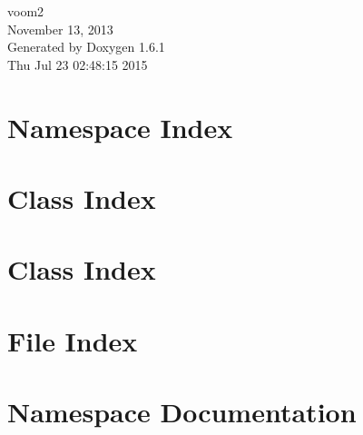 \documentclass[a4paper]{book}
\begin{document}
\hypersetup{pageanchor=false}
\begin{titlepage}
\vspace*{7cm}
\begin{center}
{\Large voom2 \\[1ex]\large November 13, 2013 }\\
\vspace*{1cm}
{\large Generated by Doxygen 1.6.1}\\
\vspace*{0.5cm}
{\small Thu Jul 23 02:48:15 2015}\\
\end{center}
\end{titlepage}
\clearemptydoublepage
{}
\tableofcontents
\clearemptydoublepage
{}
\hypersetup{pageanchor=true}
\chapter{Namespace Index}

\chapter{Class Index}

\chapter{Class Index}

\chapter{File Index}

\chapter{Namespace Documentation}

\end{document}
